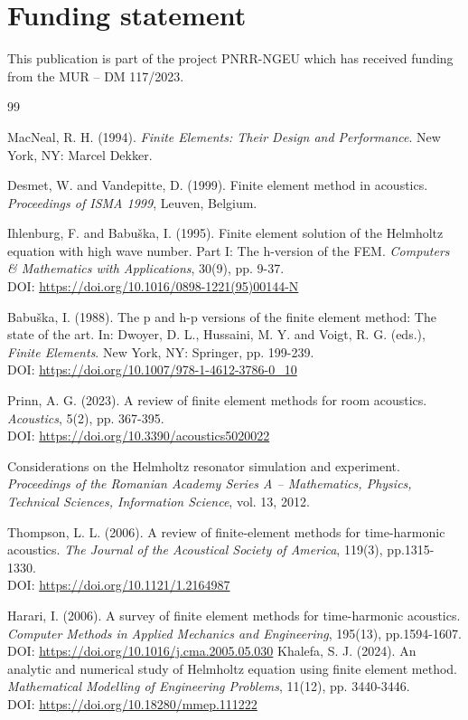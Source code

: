 \documentclass{jors}
\begin{document}
\section*{Funding statement}
This publication is part of the project PNRR-NGEU which has received funding from the MUR – DM 117/2023.
\
\begin{thebibliography}{99}

MacNeal, R. H. (1994).
\textit{Finite Elements: Their Design and Performance}.
New York, NY: Marcel Dekker.

Desmet, W. and Vandepitte, D. (1999).
Finite element method in acoustics.
\textit{Proceedings of ISMA 1999}, Leuven, Belgium.

Ihlenburg, F. and Babu{\v{s}}ka, I. (1995).
Finite element solution of the Helmholtz equation with high wave number.
Part I: The h-version of the FEM.
\textit{Computers \& Mathematics with Applications}, 30(9), pp. 9-37.\\
DOI: \url{https://doi.org/10.1016/0898-1221(95)00144-N}

Babu{\v{s}}ka, I. (1988).
The p and h-p versions of the finite element method: The state of the art.
In: Dwoyer, D. L., Hussaini, M. Y. and Voigt, R. G. (eds.),
\textit{Finite Elements}.
New York, NY: Springer, pp. 199-239.\\
DOI: \url{https://doi.org/10.1007/978-1-4612-3786-0_10}

Prinn, A. G. (2023).
A review of finite element methods for room acoustics.
\textit{Acoustics}, 5(2), pp. 367-395.\\
DOI: \url{https://doi.org/10.3390/acoustics5020022}

Considerations on the Helmholtz resonator simulation and experiment.  
\textit{Proceedings of the Romanian Academy Series A – Mathematics, Physics, Technical Sciences, Information Science},  
vol. 13, 2012.

Thompson, L. L. (2006).  
A review of finite-element methods for time-harmonic acoustics.  
\textit{The Journal of the Acoustical Society of America}, 119(3), pp.1315-1330.\\
DOI: \url{https://doi.org/10.1121/1.2164987}



Harari, I. (2006).  
A survey of finite element methods for time-harmonic acoustics.  
\textit{Computer Methods in Applied Mechanics and Engineering}, 195(13), pp.1594-1607.\\
DOI: \url{https://doi.org/10.1016/j.cma.2005.05.030}
Khalefa, S. J. (2024).  
An analytic and numerical study of Helmholtz equation using finite element method.  
\textit{Mathematical Modelling of Engineering Problems}, 11(12), pp. 3440-3446.\\
DOI: \url{https://doi.org/10.18280/mmep.111222}


\end{thebibliography}
\end{document}
